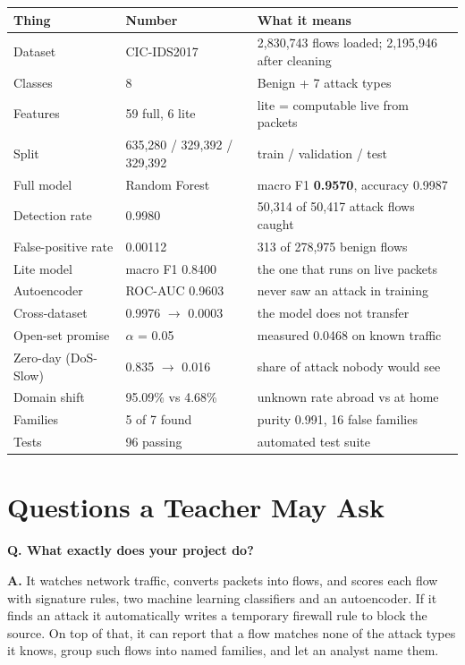 \documentclass[11pt,a4paper]{article}
\newcommand{\qa}[2]{\par\medskip\noindent\textbf{Q. #1}\par\nobreak\vspace{1pt}\textbf{\color{good}A.} #2\par}
\begin{document}
\begin{table}[h]
\centering
\small
\begin{tabular}{@{}lll@{}}
\toprule
\textbf{Thing} & \textbf{Number} & \textbf{What it means} \\
\midrule
Dataset & CIC-IDS2017 & 2,830,743 flows loaded; 2,195,946 after cleaning \\
Classes & 8 & Benign + 7 attack types \\
Features & 59 full, 6 lite & lite = computable live from packets \\
Split & 635,280 / 329,392 / 329,392 & train / validation / test \\
Full model & Random Forest & macro F1 \textbf{0.9570}, accuracy 0.9987 \\
Detection rate & 0.9980 & 50,314 of 50,417 attack flows caught \\
False-positive rate & 0.00112 & 313 of 278,975 benign flows \\
Lite model & macro F1 0.8400 & the one that runs on live packets \\
Autoencoder & ROC-AUC 0.9603 & never saw an attack in training \\
Cross-dataset & 0.9976 $\rightarrow$ 0.0003 & the model does not transfer \\
Open-set promise & $\alpha$ = 0.05 & measured 0.0468 on known traffic \\
Zero-day (DoS-Slow) & 0.835 $\rightarrow$ 0.016 & share of attack nobody would see \\
Domain shift & 95.09\% vs 4.68\% & unknown rate abroad vs at home \\
Families & 5 of 7 found & purity 0.991, 16 false families \\
Tests & 96 passing & automated test suite \\
\bottomrule
\end{tabular}
\end{table}

\section{Questions a Teacher May Ask}
\label{sec:viva}

\qa{What exactly does your project do?}
{It watches network traffic, converts packets into flows, and scores each flow
with signature rules, two machine learning classifiers and an autoencoder. If it
finds an attack it automatically writes a temporary firewall rule to block the
source. On top of that, it can report that a flow matches none of the attack types
it knows, group such flows into named families, and let an analyst name them.}
\end{document}
